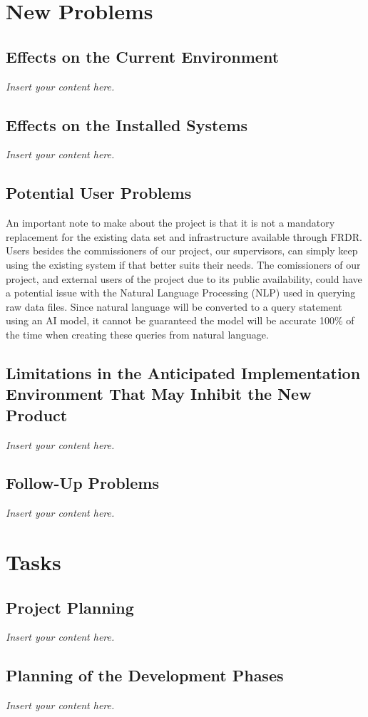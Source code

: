 \documentclass[12pt]{article}
\newcommand{\lips}{\textit{Insert your content here.}}
\begin{document}
\section{New Problems}
\subsection{Effects on the Current Environment}
\lips
\subsection{Effects on the Installed Systems}
\lips
\subsection{Potential User Problems}

\par{An important note to make about the project is that it is not a mandatory replacement for the existing data set and infrastructure 
available through FRDR. Users besides the commissioners of our project, our supervisors, can simply keep using the existing system 
if that better suits their needs. \newline \indent The comissioners of our project, and external users of the project due to its public 
availability, could have a potential issue with the Natural Language Processing (NLP) used in querying raw data files. Since natural language 
will be converted to a query statement using an AI model, it cannot be guaranteed the model will be accurate 100\% of the time when 
creating these queries from natural language.}

\subsection{Limitations in the Anticipated Implementation Environment That May
Inhibit the New Product}
\lips
\subsection{Follow-Up Problems}
\lips

\section{Tasks}
\subsection{Project Planning}
\lips
\subsection{Planning of the Development Phases}
\lips
\end{document}
